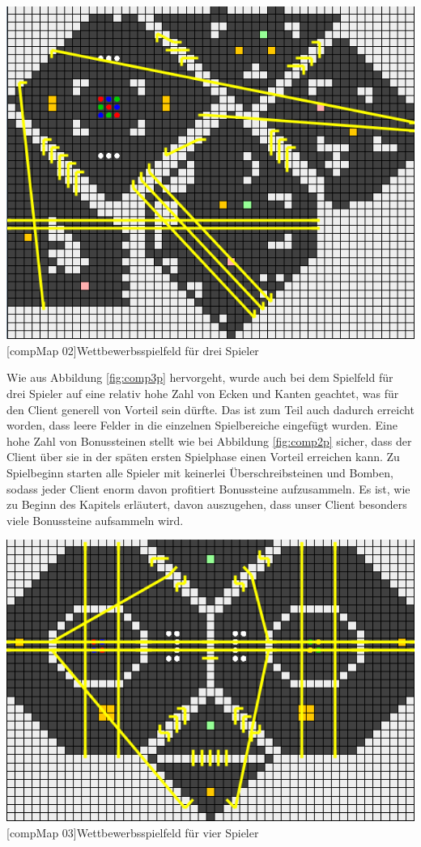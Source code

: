 \documentclass[12pt,a4paper,bibliography=totocnumbered,listof=totocnumbered,ngerman]{scrartcl}
\begin{document}
\vspace{1em}
\begin{minipage}{\linewidth}
	\centering
	\includegraphics[width=0.6\linewidth]{pics/comp2019_04_3p.png}
	[compMap 02]{Wettbewerbsspielfeld für drei Spieler}
	\label{fig:comp3p}
\end{minipage}
\vspace{1em}



Wie aus Abbildung \ref{fig:comp3p} hervorgeht, wurde auch bei dem Spielfeld für drei Spieler auf eine relativ hohe Zahl von Ecken und Kanten geachtet, was für den Client generell von Vorteil sein dürfte. Das ist zum Teil auch dadurch erreicht worden, dass leere Felder in die einzelnen Spielbereiche eingefügt wurden.
Eine hohe Zahl von Bonussteinen stellt wie bei Abbildung \ref{fig:comp2p} sicher, dass der Client über sie in der späten ersten Spielphase einen Vorteil erreichen kann. Zu Spielbeginn starten alle Spieler mit keinerlei Überschreibsteinen und Bomben, sodass jeder Client enorm davon profitiert Bonussteine aufzusammeln. Es ist, wie zu Beginn des Kapitels erläutert, davon auszugehen, dass unser Client besonders viele Bonussteine aufsammeln wird.


\vspace{1em}
\begin{minipage}{\linewidth}
	\centering
	\includegraphics[width=0.6\linewidth]{pics/comp2019_04_4p.png}
	[compMap 03]{Wettbewerbsspielfeld für vier Spieler}
	\label{fig:comp4p}
\end{minipage}
\vspace{1em}
\end{document}
